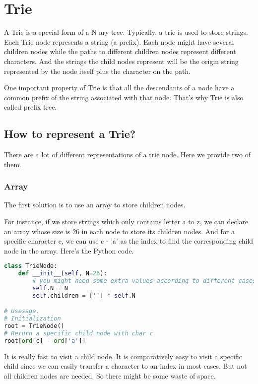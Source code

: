 
\chapter{Trie}
\label{cha:trie}

A Trie is a special form of a N-ary tree.
Typically, a trie is used to store strings.
Each Trie node represents a string (a prefix).
Each node might have several children nodes while the paths to different children nodes represent different characters.
And the strings the child nodes represent will be the origin string represented by the node itself plus the character on the path.



One important property of Trie is that all the descendants of a node have a common prefix of the string associated with that node.
That's why Trie is also called prefix tree.


\section{How to represent a Trie?}

There are a lot of different representations of a trie node.
Here we provide two of them.

\subsection{Array}

The first solution is to use an array to store children nodes.

For instance, if we store strings which only contains letter a to z, we can declare an array whose size is 26 in each node to store its children nodes.
And for a specific character c, we can use c - 'a' as the index to find the corresponding child node in the array.
Here's the Python code.
\begin{lstlisting}[language=python]
class TrieNode:
    def __init__(self, N=26):
        # you might need some extra values according to different cases
        self.N = N
        self.children = [''] * self.N

# Usesage.
# Initialization
root = TrieNode()
# Return a specific child node with char c
root[ord[c] - ord['a']]
\end{lstlisting}

It is really fast to visit a child node.
It is comparatively easy to visit a specific child since we can easily transfer a character to an index in most cases.
But not all children nodes are needed.
So there might be some waste of space.


